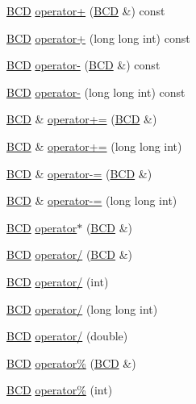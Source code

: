 \begin{DoxyCompactItemize}
\item 
\hyperlink{class_b_c_d}{B\+CD} \hyperlink{class_b_c_d_a84e1de694575ab6cf148f43b521ae010}{operator+} (\hyperlink{class_b_c_d}{B\+CD} \&) const 
\item 
\hyperlink{class_b_c_d}{B\+CD} \hyperlink{class_b_c_d_af8d4e55a38b6e917c443a61a7ef33512}{operator+} (long long int) const 
\item 
\hyperlink{class_b_c_d}{B\+CD} \hyperlink{class_b_c_d_acc78e0c63c618033421f43f687b65ae9}{operator-\/} (\hyperlink{class_b_c_d}{B\+CD} \&) const 
\item 
\hyperlink{class_b_c_d}{B\+CD} \hyperlink{class_b_c_d_a5e69415312b7917f427a375ef613880e}{operator-\/} (long long int) const 
\item 
\hyperlink{class_b_c_d}{B\+CD} \& \hyperlink{class_b_c_d_a55272642103099b941c9fc21fe0bae79}{operator+=} (\hyperlink{class_b_c_d}{B\+CD} \&)
\item 
\hyperlink{class_b_c_d}{B\+CD} \& \hyperlink{class_b_c_d_a4e2438b06a6a87460b90a6e77974e04f}{operator+=} (long long int)
\item 
\hyperlink{class_b_c_d}{B\+CD} \& \hyperlink{class_b_c_d_aed305f701cbdf1811f79f2420145be22}{operator-\/=} (\hyperlink{class_b_c_d}{B\+CD} \&)
\item 
\hyperlink{class_b_c_d}{B\+CD} \& \hyperlink{class_b_c_d_adf3faf60310aff16e350153034d9bd75}{operator-\/=} (long long int)
\item 
\hyperlink{class_b_c_d}{B\+CD} \hyperlink{class_b_c_d_ae29362779318667be5cb63d89752543b}{operator$\ast$} (\hyperlink{class_b_c_d}{B\+CD} \&)
\item 
\hyperlink{class_b_c_d}{B\+CD} \hyperlink{class_b_c_d_a2b9de76e10b1486c6b73d2a4df7284dc}{operator/} (\hyperlink{class_b_c_d}{B\+CD} \&)
\item 
\hyperlink{class_b_c_d}{B\+CD} \hyperlink{class_b_c_d_ac9db408eb339fd7a5e02c70a6c66cebf}{operator/} (int)
\item 
\hyperlink{class_b_c_d}{B\+CD} \hyperlink{class_b_c_d_a2e8486254df9a185ad6ab2e396d5a0fb}{operator/} (long long int)
\item 
\hyperlink{class_b_c_d}{B\+CD} \hyperlink{class_b_c_d_acfd0382237ed711d905c00eec1098855}{operator/} (double)
\item 
\hyperlink{class_b_c_d}{B\+CD} \hyperlink{class_b_c_d_aba1bf5cab0781816fee7055f9a667761}{operator\%} (\hyperlink{class_b_c_d}{B\+CD} \&)
\item 
\hyperlink{class_b_c_d}{B\+CD} \hyperlink{class_b_c_d_a74afbad3aaf05b2ba6ffb91b642751b0}{operator\%} (int)

\end{DoxyCompactItemize}
